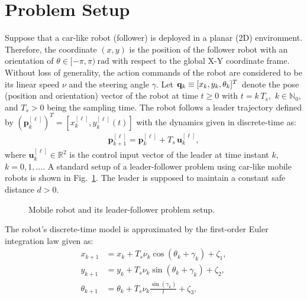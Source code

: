 \documentclass[conference]{IEEEtran}
\begin{document}
\section{Problem Setup} 
\label{sec:problemSetup}


Suppose that a car-like robot (follower) is deployed in a planar (2D) environment. Therefore, the coordinate $(x,y)$ is the position of the follower robot with an orientation of $\theta\in[-\pi,\pi)~\si{\radian}$ with respect to the global X-Y  coordinate frame.  Without loss of generality, the action commands of the robot are considered to be its linear speed $\nu$ and the steering angle $\gamma.$ Let ${\bf q}_k\equiv[x_k,y_k,\theta_k]^T$ denote the pose (position and orientation) vector of the robot at time $t\ge 0$ with $t=k \, T_s,$ $k\in\mathbb{N}_0,$ and $T_s>0$ being the sampling time.  The robot follows a leader trajectory defined by $(\mathbf{p}_k^{[\ell]})^T=[x_k^{[\ell]},y_k^{[\ell]}(t)]$ with the dynamics given in discrete-time as: %
%
\begin{align}
  \label{eq:leaderDT}
  \mathbf{p}_{k+1}^{[\ell]} = \mathbf{p}_k^{[\ell]} + T_s \, \mathbf{u}_k^{[\ell]},
\end{align}
%
where $\mathbf{u}_k^{[\ell]}\in\mathbb{R}^2$ is the control input vector of the leader at time instant $k,$ $k=0,1,\ldots.$ A standard setup of a leader-follower problem using car-like mobile robots is shown in Fig.~\ref{fig:leaderFollowerSetup}. The leader is supposed to maintain a constant safe distance $d>0.$
%
\begin{figure}
  \centering
  \caption{Mobile robot and its leader-follower problem setup.}
  \label{fig:leaderFollowerSetup}
\end{figure}
%
The robot's discrete-time model is approximated by the first-order Euler integration law given as: %
%
\begin{subequations}
  \begin{align}
    x_{k+1}& =x_{k}+T_s\nu_{k}\cos{(\theta_{k}+\gamma_{k})} + \zeta_1,\\  
    y_{k+1}& =y_{k}+T_s\nu_{k}\sin{(\theta_{k}+\gamma_{k})}+ \zeta_2,\\
    \theta_{k+1}&=\theta_{k}+T_s\nu_{k}\frac{\sin{(\gamma_{k})}}{l}+ \zeta_3,
  \end{align}
\label{eq:robotModel1-DT}
\end{subequations}
\end{document}
